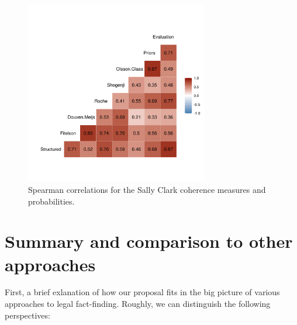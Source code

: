 \documentclass[10pt,]{scrartcl}
\begin{document}
\begin{figure}[H]\centering
    \includegraphics[width = 8cm]{../images/scSpearman.png}
    \caption{Spearman correlations for the Sally Clark coherence measures and probabilities.}
    \label{fig:spearman}
\end{figure}



\section{Summary and comparison to other approaches}\label{sec:discussion}



First, a brief exlanation of how our proposal fits in the big picture of various approaches to legal fact-finding. Roughly, we can distinguish the following perspectives:
\end{document}
